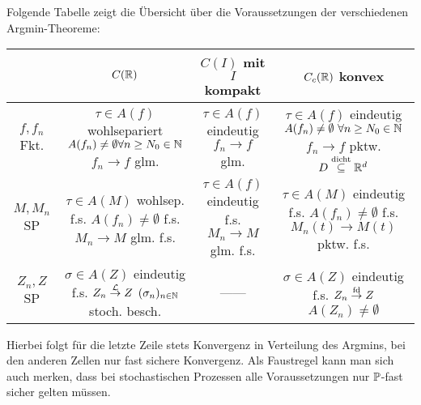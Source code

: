 
Folgende Tabelle zeigt die Übersicht über die Voraussetzungen der verschiedenen\\ Argmin-Theoreme:\nl
\begin{tabular}{c|c|c|c}
	& $C(\R)$ & $C(I)$ mit $I$ kompakt & $C_c(\R)$ konvex \\
	\hline
		\makecell{$f,f_n$\\ Fkt.} & 
		\makecell{$\tau\in A(f)$ wohlsepariert\\ $A(f_n)\neq\emptyset\forall n\geq N_0\in\N$\\ $f_n\to f$ glm.} & 
		\makecell{$\tau\in A(f)$ eindeutig\\ $f_n\to f$ glm.} & 
		\makecell{$\tau\in A(f)$ eindeutig\\ $A(f_n)\neq\emptyset~\forall n\geq N_0\in\N$\\ $f_n\to f$ pktw. $D\overset{\text{dicht}}{\subseteq}\R^d$}\\
	\hline
		\makecell{$M,M_n$\\ SP} & 
		\makecell{$\tau\in A(M)$ wohlsep. f.s.\\ $A(f_n)\neq\emptyset$ f.s. \\ $M_n\to M$ glm. f.s.} & 
		\makecell{$\tau\in A(f)$ eindeutig f.s.\\ $M_n\to M$ glm. f.s.} & 
		\makecell{$\tau\in A(M)$ eindeutig f.s.\\ $A(f_n)\neq\emptyset$ f.s.\\ $M_n(t)\to M(t)$ pktw. f.s.}\\
	\hline
		\makecell{$Z_n,Z$\\ SP} & 
		\makecell{$\sigma\in A(Z)$ eindeutig f.s.\\ $Z_n\overset{\L}{\to}Z$\\ $(\sigma_n)_{n\in\N}$ stoch. besch.} & 
		------ & 
		\makecell{$\sigma\in A(Z)$ eindeutig f.s.\\ $Z_n\overset{\fd}{\to}Z$ \\ $A(Z_n)\neq\emptyset$}\\
	\end{tabular}\nl
	Hierbei folgt für die letzte Zeile stets Konvergenz in Verteilung des Argmins, bei den anderen Zellen nur fast sichere Konvergenz.
	Als Faustregel kann man sich auch merken, dass bei stochastischen Prozessen alle Voraussetzungen nur $\P$-fast sicher gelten müssen.